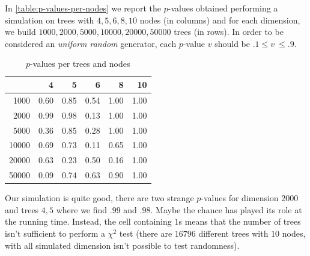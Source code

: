 In \autoref{table:p-values-per-nodes} we report the $p$-values
obtained performing a simulation on trees with $4,5,6,8,10$ nodes
(in columns) and for each dimension, we build $1000, 2000, 5000,
10000, 20000, 50000$ trees (in rows). In order to be considered an
\emph{uniform random} generator, each $p$-value $v$ should be $.1
\leq v\ \leq .9$.
\begin{table}[ht]
  \begin{center}
    \begin{tabular}{rrrrrr}
      \hline
      & 4 & 5 & 6 & 8 & 10 \\ 
      \hline
      1000 & 0.60 & 0.85 & 0.54 & 1.00 & 1.00 \\ 
      2000 & 0.99 & 0.98 & 0.13 & 1.00 & 1.00 \\ 
      5000 & 0.36 & 0.85 & 0.28 & 1.00 & 1.00 \\ 
      10000 & 0.69 & 0.73 & 0.11 & 0.65 & 1.00 \\ 
      20000 & 0.63 & 0.23 & 0.50 & 0.16 & 1.00 \\ 
      50000 & 0.09 & 0.74 & 0.63 & 0.90 & 1.00 \\ 
      \hline
    \end{tabular}
    \caption{$p$-values per trees and nodes}
    \label{table:p-values-per-nodes}
  \end{center}
\end{table}
Our simulation is quite good, there are two strange $p$-values for
dimension $2000$ and trees $4,5$ where we find $.99$ and $.98$. Maybe
the chance has played its role at the running time. Instead, the cell
containing $1$s means that the number of trees isn't sufficient to
perform a $\chi^2$ test (there are $16796$ different trees with $10$
nodes, with all simulated dimension isn't possible to test
randomness).

